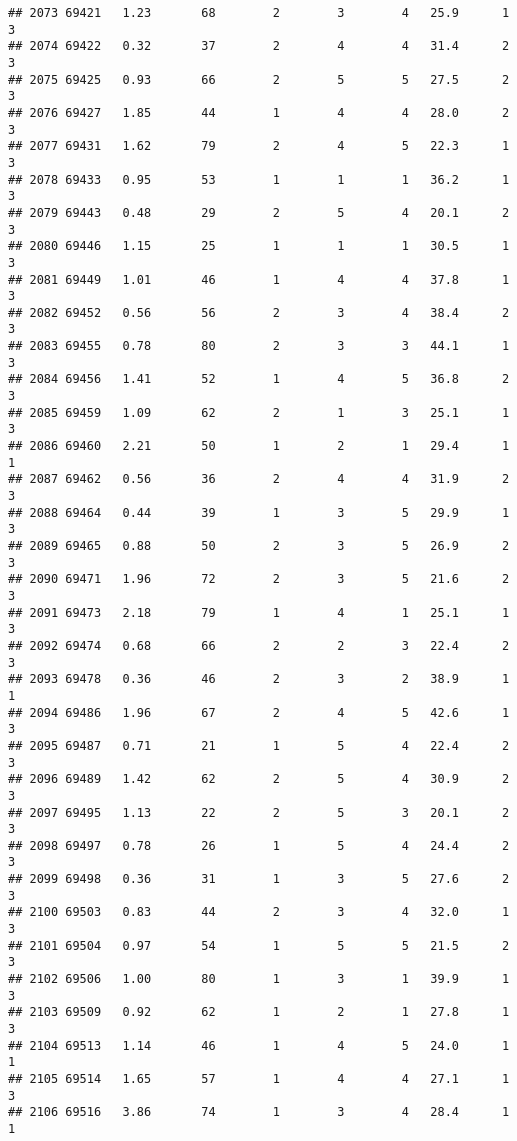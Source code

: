 \documentclass[
]{article}
\begin{document}
\begin{verbatim}
## 2073 69421   1.23       68        2        3        4   25.9      1      3
## 2074 69422   0.32       37        2        4        4   31.4      2      3
## 2075 69425   0.93       66        2        5        5   27.5      2      3
## 2076 69427   1.85       44        1        4        4   28.0      2      3
## 2077 69431   1.62       79        2        4        5   22.3      1      3
## 2078 69433   0.95       53        1        1        1   36.2      1      3
## 2079 69443   0.48       29        2        5        4   20.1      2      3
## 2080 69446   1.15       25        1        1        1   30.5      1      3
## 2081 69449   1.01       46        1        4        4   37.8      1      3
## 2082 69452   0.56       56        2        3        4   38.4      2      3
## 2083 69455   0.78       80        2        3        3   44.1      1      3
## 2084 69456   1.41       52        1        4        5   36.8      2      3
## 2085 69459   1.09       62        2        1        3   25.1      1      3
## 2086 69460   2.21       50        1        2        1   29.4      1      1
## 2087 69462   0.56       36        2        4        4   31.9      2      3
## 2088 69464   0.44       39        1        3        5   29.9      1      3
## 2089 69465   0.88       50        2        3        5   26.9      2      3
## 2090 69471   1.96       72        2        3        5   21.6      2      3
## 2091 69473   2.18       79        1        4        1   25.1      1      3
## 2092 69474   0.68       66        2        2        3   22.4      2      3
## 2093 69478   0.36       46        2        3        2   38.9      1      1
## 2094 69486   1.96       67        2        4        5   42.6      1      3
## 2095 69487   0.71       21        1        5        4   22.4      2      3
## 2096 69489   1.42       62        2        5        4   30.9      2      3
## 2097 69495   1.13       22        2        5        3   20.1      2      3
## 2098 69497   0.78       26        1        5        4   24.4      2      3
## 2099 69498   0.36       31        1        3        5   27.6      2      3
## 2100 69503   0.83       44        2        3        4   32.0      1      3
## 2101 69504   0.97       54        1        5        5   21.5      2      3
## 2102 69506   1.00       80        1        3        1   39.9      1      3
## 2103 69509   0.92       62        1        2        1   27.8      1      3
## 2104 69513   1.14       46        1        4        5   24.0      1      1
## 2105 69514   1.65       57        1        4        4   27.1      1      3
## 2106 69516   3.86       74        1        3        4   28.4      1      1

\end{verbatim}
\end{document}
